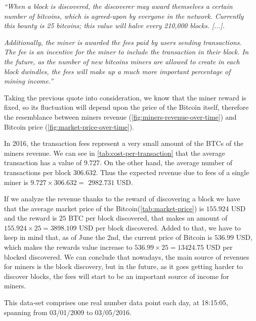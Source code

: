 \textit{``When a block is discovered, the discoverer may award
  themselves a certain number of bitcoins, which is agreed-upon by
  everyone in the network. Currently this bounty is 25 bitcoins; this
  value will halve every 210,000 blocks. [...]. } 

\textit{Additionally, the miner is awarded the fees paid by users
  sending transactions. The fee is an incentive for the miner to
  include the transaction in their block. In the future, as the number
  of new bitcoins miners are allowed to create in each block dwindles,
  the fees will make up a much more important percentage of mining
  income.''}

Taking the previous quote into consideration, we know that the miner
reward is fixed, so its fluctuation will depend upon the price of the
Bitcoin itself, therefore the resemblance between miners revenue
(\autoref{fig:miners-revenue-over-time}) and Bitcoin price
(\autoref{fig:market-price-over-time}).

In 2016, the transaction fees represent a very small amount of the
BTCs of the miners revenue. We can see in
\autoref{tab:cost-per-transaction} that the average transaction has a
value of $9.727$. On the other hand, the average number of
transactions per block $306.632$. Thus the expected revenue due to
fees of a single miner is $9.727 \times 306.632 = $
$2982.731$ USD.

If we analyze the revenue thanks to the reward of discovering a block
we have that the average market price of the
Bitcoin(\autoref{tab:market-price}) is $155.924$
USD and the reward is $25$
BTC per block discovered, that makes an amount of
$155.924 \times 25 = 3898.109$
USD per block discovered. Added to that, we have to keep in mind that,
as of June the 2nd, the current price of Bitcoin is $536.99$
USD, which makes the rewards value increase to
$536.99 \times 25 = 13424.75$
USD per blocked discovered. We can conclude that nowadays, the main
source of revenues for miners is the block discovery, but in the
future, as it goes getting harder to discover blocks, the fees will
start to be an important source of income for miners.

This data-set comprises one real number data point each day, at
18:15:05, spanning from 03/01/2009 to 03/05/2016.


